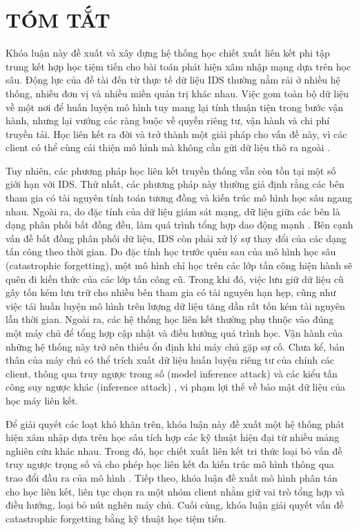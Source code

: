 \chapter*{TÓM TẮT}

Khóa luận này đề xuất và xây dựng hệ thống học chiết xuất liên kết phi tập trung kết hợp học tiệm tiến cho bài toán phát hiện xâm nhập mạng dựa trên học sâu. Động lực của đề tài đến từ thực tế dữ liệu IDS thường nằm rải ở nhiều hệ thống, nhiều đơn vị và nhiều miền quản trị khác nhau. Việc gom toàn bộ dữ liệu về một nơi để huấn luyện mô hình tuy mang lại tính thuận tiện trong bước vận hành, nhưng lại vướng các ràng buộc về quyền riêng tư, vận hành và chi phí truyền tải. Học liên kết ra đời và trở thành một giải pháp cho vấn đề này, vì các client có thể cùng cải thiện mô hình mà không cần gửi dữ liệu thô ra ngoài \cite{fedavg,li2020deepfed,FRIHA202217felids}.

Tuy nhiên, các phương pháp học liên kết truyền thống vẫn còn tồn tại một số giới hạn với IDS. Thứ nhất, các phương pháp này thường giả định rằng các bên tham gia có tài nguyên tính toán tương đồng và kiến trúc mô hình học sâu ngang nhau. Ngoài ra, do đặc tính của dữ liệu giám sát mạng, dữ liệu giữa các bên là dạng phân phối bất đồng đều, làm quá trình tổng hợp dao động mạnh \cite{li2020fedprox,acar2021feddyn}. Bên cạnh vấn đề bất đồng phân phối dữ liệu, IDS còn phải xử lý sự thay đổi của các dạng tấn công theo thời gian. Do đặc tính học trước quên sau của mô hình học sâu (catastrophic forgetting), một mô hình chỉ học trên các lớp tấn công hiện hành sẽ quên đi kiến thức của các lớp tấn công cũ. Trong khi đó, việc lưu giữ dữ liệu cũ gây tốn kém lưu trữ cho nhiều bên tham gia có tài nguyên hạn hẹp, cũng như việc tái huấn luyện mô hình trên lượng dữ liệu tăng dần rất tốn kém tài nguyên lẫn thời gian. Ngoài ra, các hệ thống học liên kết thường phụ thuộc vào đúng một máy chủ để tổng hợp cập nhật và điều hướng quá trình học. Vận hành của những hệ thống này trở nên thiếu ổn định khi máy chủ gặp sự cố. Chưa kể, bản thân của máy chủ có thể trích xuất dữ liệu huấn luyện riêng tư của chính các client, thông qua truy ngược trong số (model inference attack) \cite{melis2019mia, ateniese2015inference, zhu2019dlg, zhao2020idlg} và các kiểu tấn công suy ngược khác (inference attack) \cite{ganju2018inference, pyrgelis2017knockknock}, vi phạm lợi thế về bảo mật dữ liệu của học máy liên kết.

Để giải quyết các loạt khó khăn trên, khóa luận này đề xuất một hệ thống phát hiện xâm nhập dựa trên học sâu tích hợp các kỹ thuật hiện đại từ nhiều mảng nghiên cứu khác nhau. Trong đó, học chiết xuất liên kết tri thức loại bỏ vấn đề truy ngược trọng số và cho phép học liên kết đa kiến trúc mô hình thông qua trao đổi đầu ra của mô hình \cite{hinton2015kd,jeong2018federateddistillation,li2019fedmd,li2024fdsurvey}. Tiếp theo, khóa luận đề xuất mô hình phân tán cho học liên kết, liên tục chọn ra một nhóm client nhằm giữ vai trò tổng hợp và điều hướng, loại bỏ nút nghẽn máy chủ. Cuối cùng, khóa luận giải quyết vấn đề catastrophic forgetting bằng kỹ thuật học tiệm tiến.

